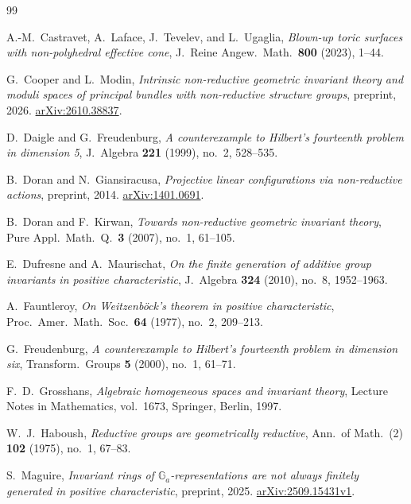 \documentclass[11pt]{amsart}
\theoremstyle{plain}
\numberwithin{equation}{section}
\newcommand{\GG}{\mathbb{G}}
\begin{document}
\begin{thebibliography}{99}

A.-M.~Castravet, A.~Laface, J.~Tevelev, and L.~Ugaglia,
\emph{Blown-up toric surfaces with non-polyhedral effective cone},
J.\ Reine Angew.\ Math.\ \textbf{800} (2023), 1--44.

G.~Cooper and L.~Modin, \emph{Intrinsic non-reductive geometric invariant
theory and moduli spaces of principal bundles with non-reductive
structure groups}, preprint, 2026.
\href{https://arxiv.org/abs/2610.38837}{arXiv:2610.38837}.

D.~Daigle and G.~Freudenburg, \emph{A counterexample to Hilbert's fourteenth
problem in dimension 5}, J.\ Algebra \textbf{221} (1999), no.~2, 528--535.

B.~Doran and N.~Giansiracusa, \emph{Projective linear configurations via
non-reductive actions}, preprint, 2014.
\href{https://arxiv.org/abs/1401.0691}{arXiv:1401.0691}.

B.~Doran and F.~Kirwan, \emph{Towards non-reductive geometric invariant theory},
Pure Appl.\ Math.\ Q.\ \textbf{3} (2007), no.~1, 61--105.

E.~Dufresne and A.~Maurischat, \emph{On the finite generation of additive group
invariants in positive characteristic}, J.\ Algebra \textbf{324} (2010),
no.~8, 1952--1963.

A.~Fauntleroy, \emph{On Weitzenb\"ock's theorem in positive characteristic},
Proc.\ Amer.\ Math.\ Soc.\ \textbf{64} (1977), no.~2, 209--213.

G.~Freudenburg, \emph{A counterexample to Hilbert's fourteenth problem in
dimension six}, Transform.\ Groups \textbf{5} (2000), no.~1, 61--71.

F.~D.~Grosshans, \emph{Algebraic homogeneous spaces and invariant theory},
Lecture Notes in Mathematics, vol.~1673, Springer, Berlin, 1997.

W.~J.~Haboush, \emph{Reductive groups are geometrically reductive},
Ann.\ of Math.\ (2) \textbf{102} (1975), no.~1, 67--83.

S.~Maguire, \emph{Invariant rings of \(\GG_a\)-representations are not always
finitely generated in positive characteristic}, preprint, 2025.
\href{https://arxiv.org/abs/2509.15431v1}{arXiv:2509.15431v1}.


\end{thebibliography}
\end{document}
